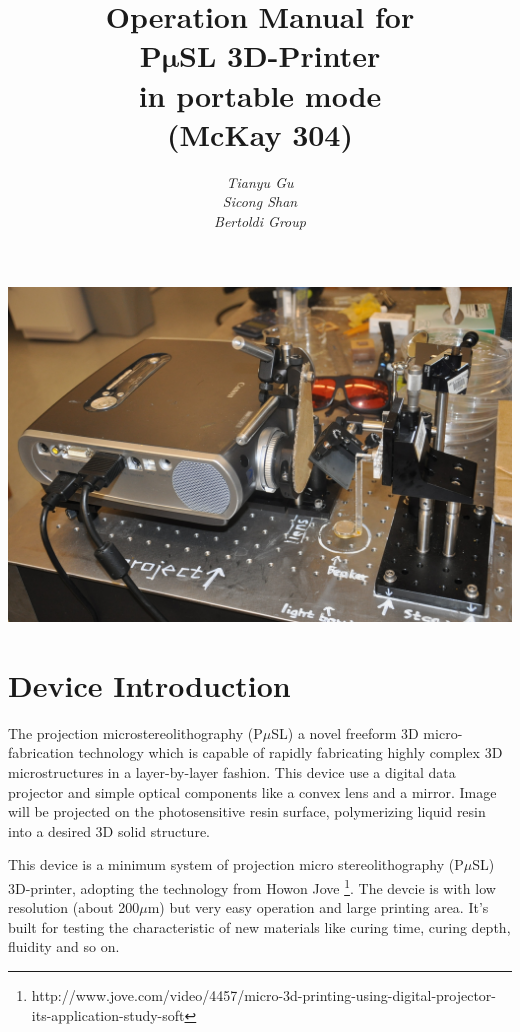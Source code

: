 \documentclass[a4paper]{article}
\title{\textbf{ 
        \Large {Operation Manual for} \\ 
        \vspace {10pt}
        \Huge {P$\bm{\mu}$SL 3D-Printer } \\
        \vspace {10pt}
        \LARGE {in portable mode}	\\
        \vspace {10pt}
        \Large{(McKay 304)}
        \vspace {20pt}
}}
\author{\textit{Tianyu Gu} \\
    \textit{Sicong Shan} \\
\textit{Bertoldi Group}}
\begin{document}
\maketitle
\vspace{50pt}

\centering
\includegraphics[width=400pt]{frontpic.jpg}
\clearpage

\tableofcontents 
\clearpage

\raggedright

\section{Device Introduction}\label{sec:device-introduction}
The projection microstereolithography (P$\mu$SL) a novel freeform 3D micro-fabrication technology 
which is capable of rapidly fabricating highly complex 3D microstructures in a layer-by-layer fashion. 
This device use a digital data projector and simple optical components like a convex lens and a mirror. 
Image will be projected on the photosensitive resin surface, polymerizing liquid resin into a desired 
3D solid structure. \\ 
\vspace{10pt}

This device is a minimum system of projection micro stereolithography (P$\mu$SL) 3D-printer, adopting the
technology from Howon Jove \footnote{http://www.jove.com/video/4457/micro-3d-printing-using-digital-projector-its-application-study-soft}.
The devcie is with low resolution (about 200$\mu$m) but very easy operation and large printing area. 
It's built for testing the characteristic of new materials like curing time, curing depth, fluidity and so on. \\
\vspace{10pt}
\end{document}
